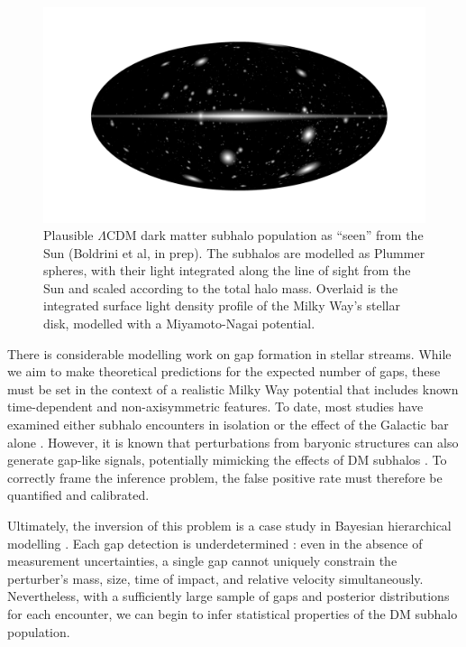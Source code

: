         \begin{figure}
            \includegraphics[width=\linewidth]{images/mollweide-density-with-haloes.png}
            \caption[Plausible $\Lambda$CDM dark matter subhalo population as ``seen'' from the Sun]{Plausible $\Lambda$CDM dark matter subhalo population as ``seen'' from the Sun (Boldrini et al, in prep). The subhalos are modelled as Plummer spheres, with their light integrated along the line of sight from the Sun and scaled according to the total halo mass. Overlaid is the integrated surface light density profile of the Milky Way's stellar disk, modelled with a Miyamoto-Nagai potential. }
            \label{fig:mollweide-density-with-haloes.png}
        \end{figure}

        There is considerable modelling work on gap formation in stellar streams. While we aim to make theoretical predictions for the expected number of gaps, these must be set in the context of a realistic Milky Way potential that includes known time-dependent and non-axisymmetric features. To date, most studies have examined either subhalo encounters in isolation \citep{2013ApJ...775...90C,2015MNRAS.450.1136E,2016MNRAS.463..102E,2016MNRAS.457.3817S,2024arXiv241213144A,2025arXiv250207781L} or the effect of the Galactic bar alone \citep{2016MNRAS.460..497H,2016ApJ...824..104P,2017NatAs...1..633P,2023A&A...678A.180T}. However, it is known that perturbations from baryonic structures can also generate gap-like signals, potentially mimicking the effects of DM subhalos \citep{2020ApJ...891..161I}. To correctly frame the inference problem, the false positive rate must therefore be quantified and calibrated.

        Ultimately, the inversion of this problem is a case study in Bayesian hierarchical modelling \citep{2020sdmm.book.....I}. Each gap detection is underdetermined \citep{2015MNRAS.450.1136E}: even in the absence of measurement uncertainties, a single gap cannot uniquely constrain the perturber's mass, size, time of impact, and relative velocity simultaneously. Nevertheless, with a sufficiently large sample of gaps and posterior distributions for each encounter, we can begin to infer statistical properties of the DM subhalo population.

